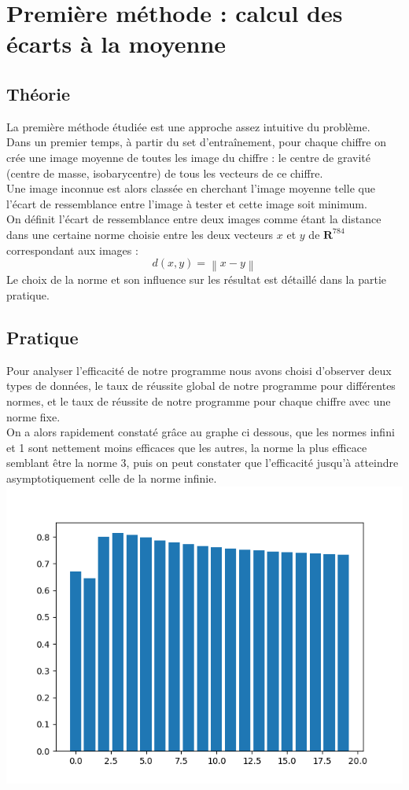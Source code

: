\documentclass[a4paper,11pt,twoside]{report}
\newcommand{\norm}[1]{\left\lVert#1\right\rVert} %
\begin{document}
\chapter{Première méthode : calcul des écarts à la moyenne} 
\section{Théorie}
La première méthode étudiée est une approche assez intuitive du problème.\\
Dans un premier temps, à partir du set d’entraînement, pour chaque chiffre on crée une image moyenne de toutes les image du chiffre : le centre de gravité (centre de masse, isobarycentre) de tous les vecteurs de ce chiffre.\\Une image inconnue est alors classée en cherchant l'image moyenne telle que l'écart de ressemblance entre l'image à tester et cette image soit minimum.\\

On définit l'écart de ressemblance entre deux images comme étant la distance dans une certaine norme choisie entre les deux vecteurs $x$ et $y$ de $\textbf{R}^{784}$ correspondant aux images : $$d(x,y) = \norm{x-y}$$ Le choix de la norme et son influence sur les résultat est détaillé dans la partie pratique.

\section{Pratique}
Pour analyser l'efficacité de notre programme nous avons choisi d'observer deux types de données, le taux de réussite global de notre programme pour différentes normes, et le taux de réussite de notre programme pour chaque chiffre avec une norme fixe.\\
On a alors rapidement constaté grâce au graphe ci dessous, que les normes infini et 1 sont nettement moins efficaces que les autres, la norme la plus efficace semblant être la norme 3, puis on peut constater que l'efficacité  jusqu'à atteindre asymptotiquement celle de la norme infinie.\\%

\includegraphics[scale=0.75]{Graphs/testNorme.png} \\
\end{document}
